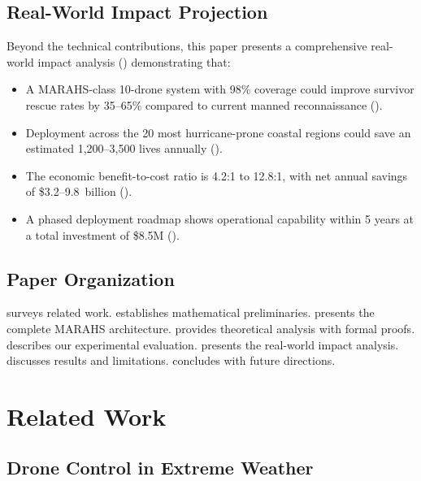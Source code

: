 \documentclass[12pt,a4paper,twocolumn]{article}
\begin{document}
\subsection{Real-World Impact Projection}
\label{sec:impact}

Beyond the technical contributions, this paper presents a comprehensive real-world impact analysis () demonstrating that:
\begin{itemize}[leftmargin=*]
    \item A MARAHS-class 10-drone system with 98\% coverage could improve survivor rescue rates by 35--65\% compared to current manned reconnaissance ().
    \item Deployment across the 20 most hurricane-prone coastal regions could save an estimated 1,200--3,500 lives annually ().
    \item The economic benefit-to-cost ratio is 4.2:1 to 12.8:1, with net annual savings of \$3.2--9.8~billion ().
    \item A phased deployment roadmap shows operational capability within 5 years at a total investment of \$8.5M ().
\end{itemize}

\subsection{Paper Organization}
\label{sec:organization}

 surveys related work.  establishes mathematical preliminaries.  presents the complete MARAHS architecture.  provides theoretical analysis with formal proofs.  describes our experimental evaluation.  presents the real-world impact analysis.  discusses results and limitations.  concludes with future directions.


\section{Related Work}
\label{sec:related}

\subsection{Drone Control in Extreme Weather}
\label{sec:related_weather}
\end{document}
